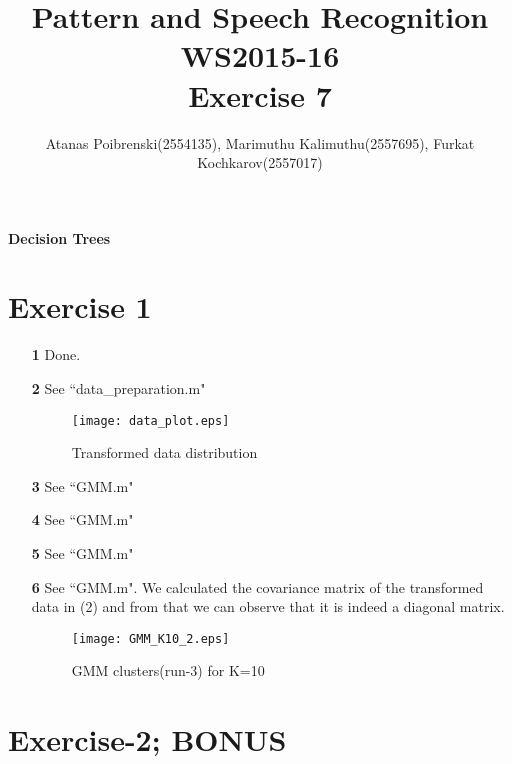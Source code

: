 \documentclass[a4paper]{article}
\title{Pattern and Speech Recognition WS2015-16 \\ Exercise 7}
\author{Atanas Poibrenski(2554135), Marimuthu Kalimuthu(2557695), Furkat Kochkarov(2557017)}
\begin{document}
\maketitle 
\begin{center}
	\textbf{Decision Trees}
\end{center}

\section*{Exercise 1}
\begin{enumerate}
	\item[ \textbf{1} ] Done.
	\item[ \textbf{2} ] See ``data\_preparation.m"

	\begin{figure}[H]
		\begin{center}
			\texttt{[image: data\_plot.eps]}
			\caption{Transformed data distribution}\label{fig:transdata}
		\end{center}
	\end{figure}

	\item[ \textbf{3} ] See ``GMM.m"
	\item[ \textbf{4} ] See ``GMM.m"
	\item[ \textbf{5} ] See ``GMM.m"
	\item[ \textbf{6} ] See ``GMM.m". We calculated the covariance matrix of the transformed data in (2) and from that we can observe that it is indeed a diagonal matrix.
	
		\begin{figure}[H]
			\begin{center}
				\texttt{[image: GMM\_K10\_2.eps]}
				\caption{GMM clusters(run-3) for K=10}\label{fig:gmm_k10_2}
			\end{center}
		\end{figure}

		

\end{enumerate}

\section*{Exercise-2; BONUS}
		
\end{document}
